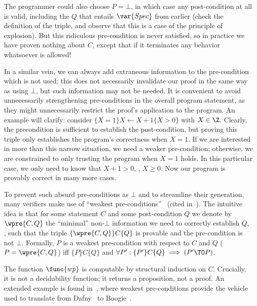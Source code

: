 The programmer could also choose \(P = \bot\), in which case any post-condition
at all is valid, including the \(Q\) that entails \(\var{Spec}\) from earlier
(check the definition of the triple, and observe that this is a case of the
principle of explosion). But this ridiculous pre-condition is never satisfied,
so in practice we have proven nothing about \(C\), except that if it terminates
any behavior whatsoever is allowed!

In a similar vein, we can always add extraneous information to the pre-condition
which is not used; this does not necessarily invalidate our proof in the same
way as using \(\bot\), but such information may not be needed. It is convenient
to avoid unnecessarily strengthening pre-conditions in the overall program
statement, as they might unnecessarily restrict the proof's application to the
program. An example will clarify: consider \(\{X = 1\}X \gets X + 1\{X > 0\}\)
with \(X \in \Z\). Clearly, the precondition is sufficient to establish the
post-condition, but proving this triple only establishes the program's
correctness when \(X = 1\). If we are interested in more than this narrow
situation, we need a weaker pre-condition; otherwise, we are constrained to only
trusting the program when \(X = 1\) holds. In this particular case, we only need
to know that \(X + 1 > 0\), \ie, \(X \ge 0\). Now our program is provably
correct in many more cases.

To prevent such absurd pre-conditions as \(\bot\) and to streamline their
generation, many verifiers make use of ``weakest
pre-conditions''~\cite{dijkstra1976discipline,Nelson_1989} (cited
in~\cite{leino2008specification}). The intuitive idea is that for some statement
\(C\) and some post-condition \(Q\) we denote by \(\wpre{C, Q}\) the ``minimal''
non-\(\bot\) information we need to correctly establish \(Q\), \ie, such that
the triple \(\{\wpre{C,Q}\} C \{Q\}\) is provable and the pre-condition is not
\(\bot\). Formally, \(P\) is a weakest pre-condition with respect to \(C\) and
\(Q\) (\(P = \wpre{C,Q}\)) iff \(\{P\} C \{Q\}\) and \(\forall P': \{P'\} C
\{Q\} \implies (P' \TO P)\).

The function \(\func{wp}\) is computable by structural induction on
\(C\). Crucially, it is not a decidability function; it returns a proposition,
not a proof. An extended example is found in~\cite[\S 3]{leino2008specification},
where weakest pre-conditions provide the vehicle used to translate from
Dafny~\cite{leino2010dafny} to Boogie~\cite{Barnett_2006,leino2008this}.

